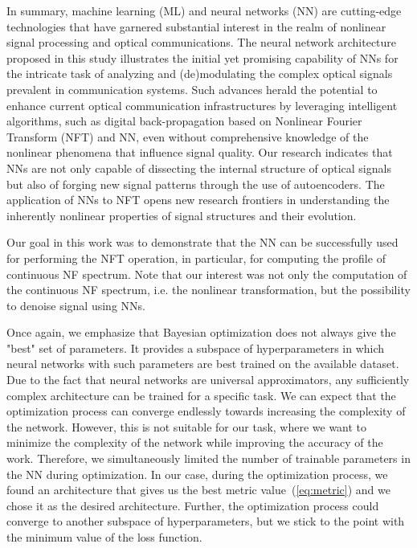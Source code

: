 In summary, machine learning (ML) and neural networks (NN) are cutting-edge technologies that have garnered substantial interest in the realm of nonlinear signal processing and optical communications. The neural network architecture proposed in this study illustrates the initial yet promising capability of NNs for the intricate task of analyzing and (de)modulating the complex optical signals prevalent in communication systems. Such advances herald the potential to enhance current optical communication infrastructures by leveraging intelligent algorithms, such as digital back-propagation based on Nonlinear Fourier Transform (NFT) and NN, even without comprehensive knowledge of the nonlinear phenomena that influence signal quality.
Our research indicates that NNs are not only capable of dissecting the internal structure of optical signals but also of forging new signal patterns through the use of autoencoders. The application of NNs to NFT opens new research frontiers in understanding the inherently nonlinear properties of signal structures and their evolution. 


Our goal in this work was to demonstrate that the NN can be successfully used for performing the NFT operation, in particular, for computing the profile of continuous NF spectrum. 
Note that our interest was not only the computation of the continuous NF spectrum, i.e. the nonlinear transformation, but the possibility to denoise signal using NNs. 

Once again, we emphasize that Bayesian optimization does not always give the "best" set of parameters.
It provides a subspace of hyperparameters in which neural networks with such parameters are best trained on the available dataset.
Due to the fact that neural networks are universal approximators, any sufficiently complex architecture can be trained for a specific task.
We can expect that the optimization process can converge endlessly towards increasing the complexity of the network.
However, this is not suitable for our task, where we want to minimize the complexity of the network while improving the accuracy of the work. 
Therefore, we simultaneously limited the number of trainable parameters in the NN during optimization.
In our case, during the optimization process, we found an architecture that gives us the best metric value~(\ref{eq:metric}) and we chose it as the desired architecture. Further, the optimization process could converge to another subspace of hyperparameters, but we stick to the point with the minimum value of the loss function.

